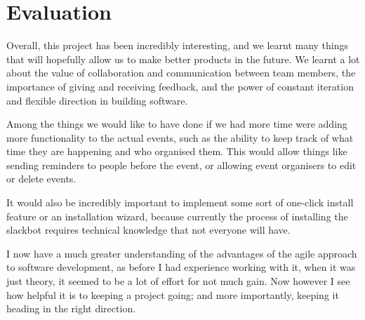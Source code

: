 \documentclass{report}
\begin{document}
\section{Evaluation}
Overall, this project has been incredibly interesting, and we learnt many things that will hopefully allow us to make better products in the future. We learnt a lot about the value of collaboration and communication between team members, the importance of giving and receiving feedback, and the power of constant iteration and flexible direction in building software.

Among the things we would like to have done if we had more time were adding more functionality to the actual events, such as the ability to keep track of what time they are happening and who organised them. This would allow things like sending reminders to people before the event, or allowing event organisers to edit or delete events.

It would also be incredibly important to implement some sort of one-click install feature or an installation wizard, because currently the process of installing the slackbot requires technical knowledge that not everyone will have.

I now have a much greater understanding of the advantages of the agile approach to software development, as before I had experience working with it, when it was just theory, it seemed to be a lot of effort for not much gain. Now however I see how helpful it is to keeping a project going; and more importantly, keeping it heading in the right direction.
\end{document}
